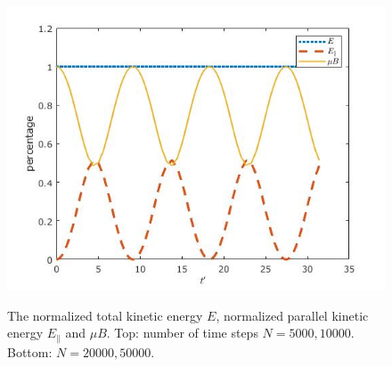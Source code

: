 \documentclass{article}
\begin{document}
\begin{enumerate}
\begin{enumerate}
\begin{figure}[h]
{\includegraphics[scale=0.29]{problem4a/energy_50000.jpg}
}
\caption{The normalized total kinetic energy $E$, normalized parallel kinetic energy $E_\parallel $ and $\mu B$. Top: number of time steps $N = 5000, 10000$. Bottom: $N = 20000, 50000$.}
\label{problem 1.4}
\end{figure}

\end{enumerate}

\end{enumerate}
\end{document}
